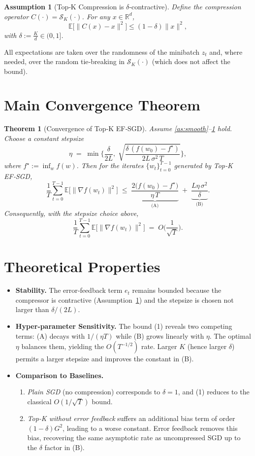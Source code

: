 \documentclass{article}
\newtheorem{theorem}{Theorem}
\newtheorem{assumption}{Assumption}
\newcommand{\topk}[1]{\mathcal{S}_K(#1)} %
\newcommand{\E}{\mathbb{E}}
\begin{document}
\begin{assumption}[Top‑K Compression is $\delta$‑contractive]\label{as:contract}
Define the compression operator $C(\cdot)=\topk{\cdot}$.  
For any $x\in\mathbb{R}^d$,
\[
    \E\big[\|C(x)-x\|^2\big]\le (1-\delta)\|x\|^2,
\]
with $\displaystyle \delta:=\frac{K}{d}\in(0,1]$.
\end{assumption}

All expectations are taken over the randomness of the minibatch $z_t$ and, where needed, over the random tie‑breaking in $\topk{\cdot}$ (which does not affect the bound).

\section*{Main Convergence Theorem}
\begin{theorem}[Convergence of Top‑K EF‑SGD]\label{thm:main}
Assume \ref{as:smooth}–\ref{as:contract} hold.  
Choose a constant stepsize 
\[
    \eta \;=\; \min\!\Big\{\frac{\delta}{2L},\;\sqrt{\frac{\delta\,(f(w_0)-f^\star)}{2L\,\sigma^2\,T}}\Big\},
\]
where $f^\star:=\inf_{w}f(w)$.  
Then for the iterates $\{w_t\}_{t=0}^{T-1}$ generated by Top‑K EF‑SGD,
\[
\frac{1}{T}\sum_{t=0}^{T-1}\E\!\big[\|\nabla f(w_t)\|^2\big]
\;\le\;
\underbrace{\frac{2\big(f(w_0)-f^\star\big)}{\eta\,T}}_{\text{(A)}}
\;+\;
\underbrace{\frac{L\eta\,\sigma^2}{\delta}}_{\text{(B)}} .
\tag{1}
\]
Consequently, with the stepsize choice above,
\[
\frac{1}{T}\sum_{t=0}^{T-1}\E\!\big[\|\nabla f(w_t)\|^2\big]
\;=\; O\!\Big(\frac{1}{\sqrt{T}}\Big).
\]
\end{theorem}

\section*{Theoretical Properties}
\begin{itemize}
    \item \textbf{Stability.} The error‑feedback term $e_t$ remains bounded because the compressor is contractive (Assumption~\ref{as:contract}) and the stepsize is chosen not larger than $\delta/(2L)$.
    \item \textbf{Hyper‑parameter Sensitivity.} The bound (1) reveals two competing terms: (A) decays with $1/(\eta T)$ while (B) grows linearly with $\eta$. The optimal $\eta$ balances them, yielding the $O(T^{-1/2})$ rate. Larger $K$ (hence larger $\delta$) permits a larger stepsize and improves the constant in (B).
    \item \textbf{Comparison to Baselines.}
    \begin{enumerate}
        \item \emph{Plain SGD} (no compression) corresponds to $\delta=1$, and (1) reduces to the classical $O(1/\sqrt{T})$ bound.
        \item \emph{Top‑K without error feedback} suffers an additional bias term of order $(1-\delta)G^2$, leading to a worse constant. Error feedback removes this bias, recovering the same asymptotic rate as uncompressed SGD up to the $\delta$ factor in (B).
    \end{enumerate}
\end{itemize}
\end{document}

